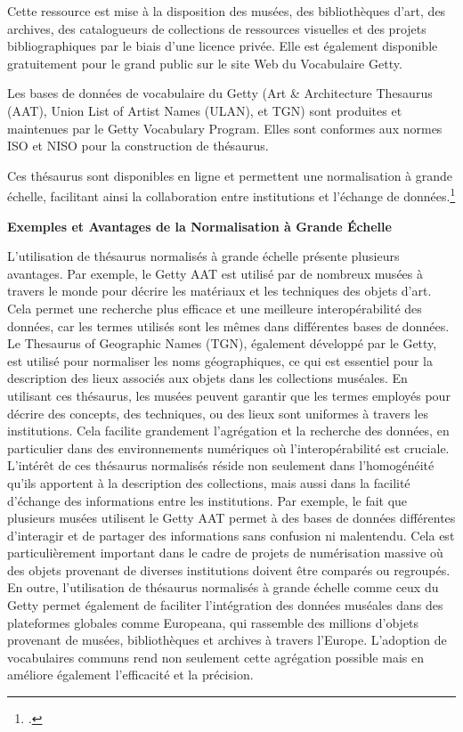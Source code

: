 Cette ressource est mise à la disposition des musées, des bibliothèques d'art, des archives, des catalogueurs de collections de ressources visuelles et des projets bibliographiques par le biais d'une licence privée. Elle est également disponible gratuitement pour le grand public sur le site Web du Vocabulaire Getty.

Les bases de données de vocabulaire du Getty (Art \& Architecture Thesaurus (AAT), Union List of Artist Names (ULAN), et TGN) sont produites et maintenues par le Getty Vocabulary Program. Elles sont conformes aux normes ISO et NISO pour la construction de thésaurus.

Ces thésaurus sont disponibles en ligne et permettent une normalisation à grande échelle, facilitant ainsi la collaboration entre institutions et l'échange de données.\footcite{getty_theso} \newline

\textbf{Exemples et Avantages de la Normalisation à Grande Échelle}\newline

L'utilisation de thésaurus normalisés à grande échelle présente plusieurs avantages. Par exemple, le Getty AAT est utilisé par de nombreux musées à travers le monde pour décrire les matériaux et les techniques des objets d'art. Cela permet une recherche plus efficace et une meilleure interopérabilité des données, car les termes utilisés sont les mêmes dans différentes bases de données.
Le Thesaurus of Geographic Names (TGN), également développé par le Getty, est utilisé pour normaliser les noms géographiques, ce qui est essentiel pour la description des lieux associés aux objets dans les collections muséales. En utilisant ces thésaurus, les musées peuvent garantir que les termes employés pour décrire des concepts, des techniques, ou des lieux sont uniformes à travers les institutions. Cela facilite grandement l'agrégation et la recherche des données, en particulier dans des environnements numériques où l'interopérabilité est cruciale.
L’intérêt de ces thésaurus normalisés réside non seulement dans l’homogénéité qu’ils apportent à la description des collections, mais aussi dans la facilité d’échange des informations entre les institutions. Par exemple, le fait que plusieurs musées utilisent le Getty AAT permet à des bases de données différentes d’interagir et de partager des informations sans confusion ni malentendu. Cela est particulièrement important dans le cadre de projets de numérisation massive où des objets provenant de diverses institutions doivent être comparés ou regroupés.
En outre, l'utilisation de thésaurus normalisés à grande échelle comme ceux du Getty permet également de faciliter l'intégration des données muséales dans des plateformes globales comme Europeana, qui rassemble des millions d'objets provenant de musées, bibliothèques et archives à travers l'Europe. L'adoption de vocabulaires communs rend non seulement cette agrégation possible mais en améliore également l'efficacité et la précision. \newline

